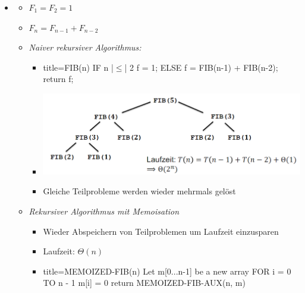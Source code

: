 \documentclass[
    12pt,
    a4paper,
    ngerman,
    color=3b,%
    marginpar=false,
    colorback=false,
    leqno,
]{tudaexercise}
\begin{document}
\begin{itemize}
        \item {}
            \begin{itemize}
                \item $F_1 = F_2 = 1$
                \item $F_n = F_{n-1} + F_{n-2}$
                \item \textit{Naiver rekursiver Algorithmus:}
                    \begin{itemize}
                        \item[]
                            \begin{ccode}[autogobble,escapeinside=||]{title={FIB(n)}}
                            IF n |$\leq$| 2
                                f = 1;
                            ELSE
                                f = FIB(n-1) + FIB(n-2);
                            return f;
                            \end{ccode}
                            \item[] \includegraphics[width=13cm]{pictures/fibBaum.PNG}
                            \item[] Gleiche Teilprobleme werden wieder mehrmals gelöst  
                    \end{itemize}
\pagebreak
                \item \textit{Rekursiver Algorithmus mit Memoisation}
                    \begin{itemize}
                        \item Wieder Abspeichern von Teilproblemen um Laufzeit einzusparen
                        \item Laufzeit: $\Theta(n)$
                        \item[]
                            \begin{ccode}[autogobble,escapeinside=||]{title={MEMOIZED-FIB(n)}}
                            Let m[0...n-1] be a new array
                            FOR i = 0 TO n - 1
                                m[i] = 0
                            return MEMOIZED-FIB-AUX(n, m)
                            \end{ccode}

\end{itemize}
\end{itemize}
\end{itemize}
\end{document}
